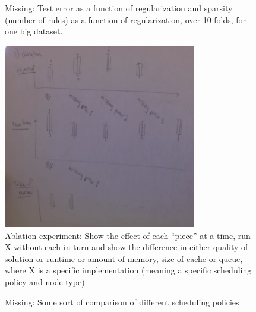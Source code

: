 \begin{figure}[t!]
\begin{center}
\end{center}
\caption{Missing:  Test error as a function of regularization and sparsity
(number of rules) as a function of regularization, over 10 folds,
for one big dataset.}
\label{fig:regularization}
\end{figure}

\begin{figure}[t!]
\begin{center}
\includegraphics[width=0.75\textwidth]{figs/sketch-ablation.png}
\end{center}
\caption{Ablation experiment:
Show the effect of each ``piece'' at a time,
run X without each in turn and show the difference in either
quality of solution or runtime or amount of memory, size of cache or queue,
where X is a specific implementation
(meaning a specific scheduling policy and node type)}
\label{fig:ablation}
\end{figure}

\begin{figure}[t!]
\begin{center}
\end{center}
\caption{Missing:  Some sort of comparison of different scheduling policies}
\label{fig:scheduling-policy}
\end{figure}

